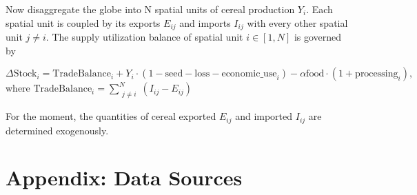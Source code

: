 \documentclass[11pt]{article}
\begin{document}
Now disaggregate the globe into N spatial units of cereal production $Y_i$. Each spatial unit is coupled by its exports $E_{ij}$ and imports $I_{ij}$ with every other spatial unit $j\neq i$. The supply utilization balance of spatial unit $i\in[1,N]$ is governed by

\begin{equation}
\Delta\text{Stock}_i = \text{TradeBalance}_i + Y_i \cdot (1 - \text{seed} - \text{loss} - \text{economic\_use}_i ) - \alpha \text{food} \cdot (1 + \text{processing}_i) ,
\end{equation}
where  $\text{TradeBalance}_i = \sum_{\substack{j \neq i}}^{N} ( I_{ij} - E_{ij} )$


For the moment, the quantities of cereal exported $E_{ij}$ and imported $I_{ij}$ are determined exogenously.


\section*{Appendix: Data Sources}

\begin{table}[h]
    \caption{\textbf{Data sources and characteristics}. \textsuperscript{1}Unlike the Food and Agriculture Organization (FAO), the United States Department of Agriculture International Statistics Division (USDA PSD, \url{https://apps.fas.usda.gov/psdonline}) is not constrained to only use stock levels reported by national stastitics offices. \textsuperscript{2}There is a discontinuity in the methodology used to estimate allocations circa 2012.}
    \label{tab:data_sources}
\end{table}
\end{document}
